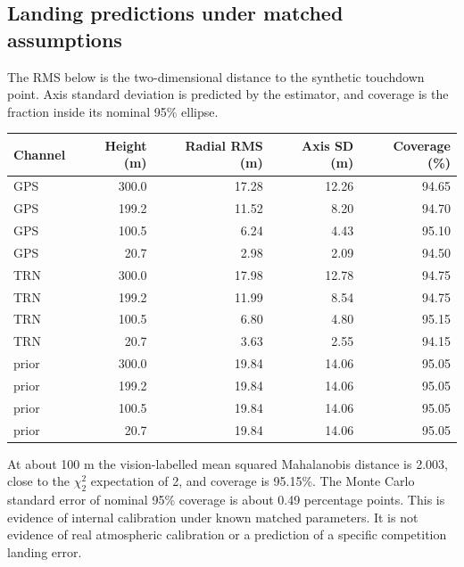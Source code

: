 \documentclass[11pt,a4paper]{article}
\numberwithin{equation}{section}
\begin{document}
\subsection{Landing predictions under matched assumptions}
The RMS below is the two-dimensional distance to the synthetic touchdown point. Axis standard deviation is predicted by the estimator, and coverage is the fraction inside its nominal 95\% ellipse.
\begin{center}
\begin{tabular}{lrrrr}
\toprule
Channel & Height (m) & Radial RMS (m) & Axis SD (m) & Coverage (\%)\\
\midrule
GPS & 300.0 & 17.28 & 12.26 & 94.65\\
GPS & 199.2 & 11.52 & 8.20 & 94.70\\
GPS & 100.5 & 6.24 & 4.43 & 95.10\\
GPS & 20.7 & 2.98 & 2.09 & 94.50\\
TRN & 300.0 & 17.98 & 12.78 & 94.75\\
TRN & 199.2 & 11.99 & 8.54 & 94.75\\
TRN & 100.5 & 6.80 & 4.80 & 95.15\\
TRN & 20.7 & 3.63 & 2.55 & 94.15\\
prior & 300.0 & 19.84 & 14.06 & 95.05\\
prior & 199.2 & 19.84 & 14.06 & 95.05\\
prior & 100.5 & 19.84 & 14.06 & 95.05\\
prior & 20.7 & 19.84 & 14.06 & 95.05\\
\bottomrule
\end{tabular}
\end{center}
At about 100 m the vision-labelled mean squared Mahalanobis distance is 2.003, close to the $\chi^2_2$ expectation of 2, and coverage is 95.15\%. The Monte Carlo standard error of nominal 95\% coverage is about 0.49 percentage points. This is evidence of internal calibration under known matched parameters. It is not evidence of real atmospheric calibration or a prediction of a specific competition landing error.
\end{document}
